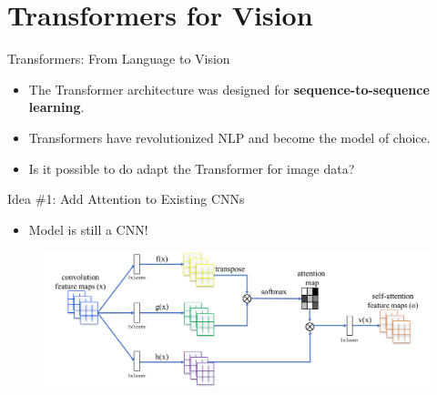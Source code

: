 \section{Transformers for Vision}

\begin{frame}{Transformers: From Language to Vision}
    \begin{itemize}
        \item The Transformer architecture was designed for \textbf{sequence-to-sequence learning}.
        \item Transformers have revolutionized NLP and become the model of choice.
	    \item Is it possible to do adapt the Transformer for image data?
    \end{itemize}
\end{frame}


\begin{frame}{Idea \#1: Add Attention to Existing CNNs}
    \begin{itemize}
        \item Model is still a CNN!
    \end{itemize}
    \begin{figure}
        \centering
        \includegraphics[width=\linewidth]{pic/framework}
        \label{fig:idea1}
    \end{figure}
\end{frame}

